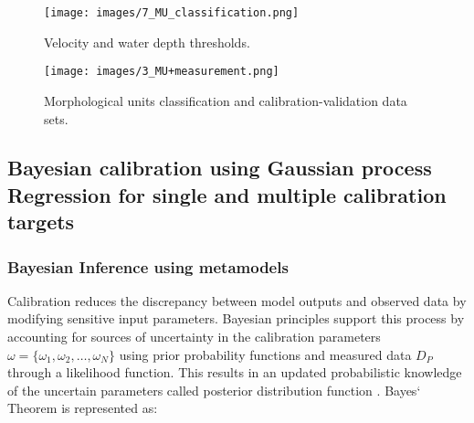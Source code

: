 \documentclass[draft,linenumbers,onecolumn]{agujournal2019} %
\begin{document}

\begin{figure}[!htbp]
	\centering
	\texttt{[image: images/7\_MU\_classification.png]}
	\caption{Velocity and water depth thresholds.}
	\label{fig:MU_thresholds}
\end{figure}

\begin{figure}[!htbp]
	\centering
	\texttt{[image: images/3\_MU+measurement.png]}
	\caption{Morphological units classification and calibration-validation data sets.}
	\label{fig:MU}
\end{figure}

\subsection{Bayesian calibration using Gaussian process Regression for single and multiple calibration targets}\label{sec:sec2.6}

\subsubsection{Bayesian Inference using metamodels}
\label{subsec:sec2.6.1}
Calibration reduces the discrepancy between model outputs and observed data by modifying sensitive input parameters. Bayesian principles support this process by accounting for sources of uncertainty in the calibration parameters $\omega = \{\omega_1, \omega_2, \ldots, \omega_N\}$ using  prior probability functions and measured data  $D_P$ through a likelihood function. This results in an updated probabilistic knowledge of the uncertain parameters called posterior distribution function \cite{smith1992bayesian,lim2017comprehensive}. Bayes` Theorem is represented as: 
\end{document}
